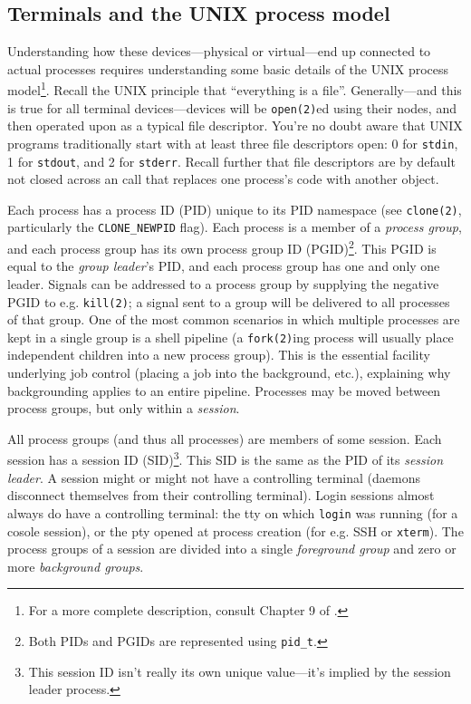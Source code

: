 \subsection{Terminals and the UNIX process model}
\label{sec:unixprocs}

Understanding how these devices---physical or virtual---end up connected to
actual processes requires understanding some basic details of the UNIX
process model\footnote{For a more complete description, consult Chapter 9
of \cite{apiue}.}. Recall the UNIX principle that ``everything is a file''. Generally---and
this is true for all terminal devices---devices will be \texttt{open(2)}ed
using their  nodes, and then operated upon as a typical file
descriptor. You're no doubt aware that UNIX programs traditionally start with
at least three file descriptors open: 0 for \texttt{stdin}, 1 for
\texttt{stdout}, and 2 for \texttt{stderr}. Recall further that file descriptors
are by default not closed across an  call that replaces one
process's code with another object.

Each process has a process ID (PID) unique to its PID namespace (see
\texttt{clone(2)}\cite{clone2}, particularly the \texttt{CLONE\_NEWPID} flag).
Each process is a member of a \textit{process group}, and each process group
has its own process group ID (PGID)\footnote{Both PIDs and PGIDs are represented using \texttt{pid\_t}.}.
This PGID is equal to the \textit{group leader}'s PID, and each process group
has one and only one leader. Signals can be addressed to a process group by
supplying the negative PGID to e.g. \texttt{kill(2)}; a signal sent to a group
will be delivered to all processes of that group. One of the most common
scenarios in which multiple processes are kept in a single group is a shell
pipeline (a \texttt{fork(2)}ing process will usually place independent children
into a new process group). This is the essential facility underlying job control
(placing a job into the background, etc.), explaining why backgrounding
applies to an entire pipeline. Processes may be moved between process groups,
but only within a \textit{session}.

All process groups (and thus all processes) are members of some session. Each
session has a session ID (SID)\footnote{This session ID isn't really its own
unique value---it's implied by the session leader process.}. This SID
is the same as the PID of its \textit{session leader}. A session might or might
not have a controlling terminal (daemons disconnect themselves from their
controlling terminal). Login sessions almost always do have a controlling
terminal: the tty on which \texttt{login} was running (for a cosole session),
or the pty opened at process creation (for e.g. SSH or \texttt{xterm}). The
process groups of a session are divided into a single \textit{foreground group}
and zero or more \textit{background groups}.


